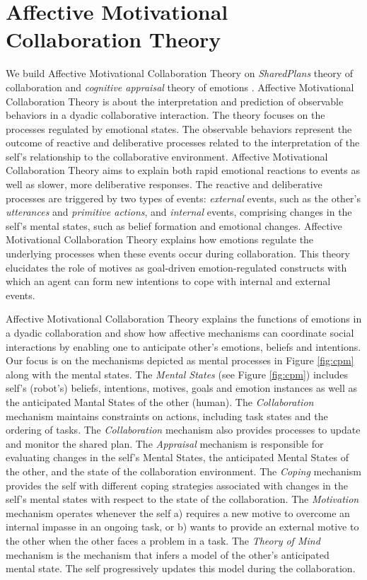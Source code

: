 \documentclass[letterpaper]{article}
\begin{document}
\section{Affective Motivational Collaboration Theory}

We build Affective Motivational Collaboration Theory on \textit{SharedPlans}
theory of collaboration \cite{grosz:plans-discourse} and \textit{cognitive
appraisal} theory of emotions \cite{gratch:domain-independent}. Affective
Motivational Collaboration Theory is about the interpretation and prediction of
observable behaviors in a dyadic collaborative interaction. The theory focuses
on the processes regulated by emotional states. The observable behaviors
represent the outcome of reactive and deliberative processes related to the
interpretation of the self's relationship to the collaborative environment.
Affective Motivational Collaboration Theory aims to explain both rapid emotional
reactions to events as well as slower, more deliberative responses. The reactive
and deliberative processes are triggered by two types of events:
\textit{external} events, such as the other's \textit{utterances} and
\textit{primitive actions}, and \textit{internal} events, comprising changes in
the self's mental states, such as belief formation and emotional changes.
Affective Motivational Collaboration Theory explains how emotions regulate the
underlying processes when these events occur during collaboration. This theory
elucidates the role of motives as goal-driven emotion-regulated constructs with
which an agent can form new intentions to cope with internal and external
events.

Affective Motivational Collaboration Theory explains the functions of emotions
in a dyadic collaboration and show how affective mechanisms can coordinate
social interactions by enabling one to anticipate other's emotions, beliefs and
intentions. Our focus is on the mechanisms depicted as mental processes in
Figure \ref{fig:cpm} along with the mental states. The \textit{Mental States}
(see Figure \ref{fig:cpm}) includes self's (robot's) beliefs, intentions,
motives, goals and emotion instances as well as the anticipated Mantal States of
the other (human). The \textit{Collaboration} mechanism maintains constraints on
actions, including task states and the ordering of tasks. The
\textit{Collaboration} mechanism also provides processes to update and monitor
the shared plan. The \textit{Appraisal} mechanism is responsible for evaluating
changes in the self's Mental States, the anticipated Mental States of the other,
and the state of the collaboration environment. The \textit{Coping} mechanism
provides the self with different coping strategies associated with changes in
the self's mental states with respect to the state of the collaboration. The
\textit{Motivation} mechanism operates whenever the self a) requires a new
motive to overcome an internal impasse in an ongoing task, or b) wants to
provide an external motive to the other when the other faces a problem in a
task. The \textit{Theory of Mind} mechanism is the mechanism that infers a
model of the other's anticipated mental state. The self progressively updates
this model during the collaboration.
\end{document}
